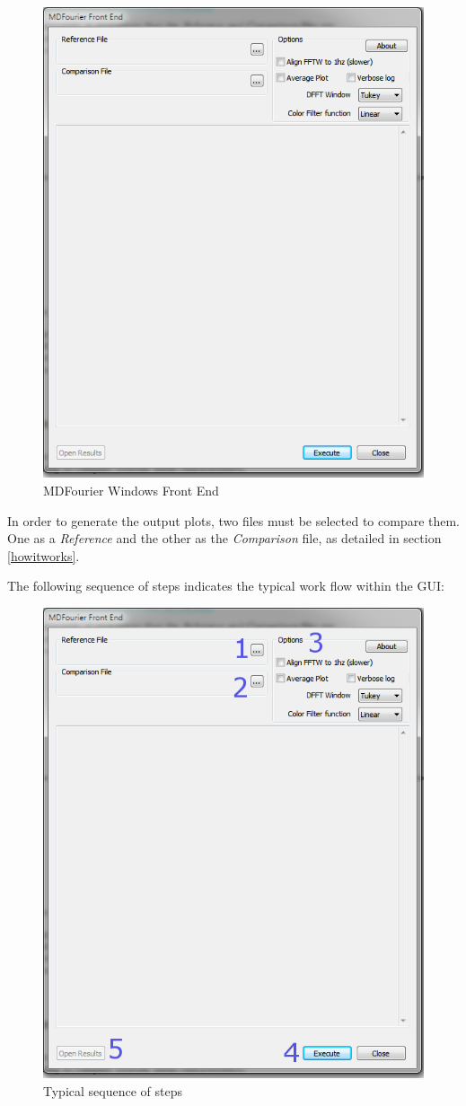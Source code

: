 \documentclass[10pt,a4paper]{report}
\begin{document}
\begin{figure}[H]
	\centering
	\includegraphics[width=0.6\linewidth]{plots/GUI1.png}
	\caption[Front End]{MDFourier Windows Front End}
	\label{fig:gui1}
\end{figure}

In order to generate the output plots, two files must be selected to compare them. One as a \textit{Reference} and the other as the \textit{Comparison} file, as detailed in section \ref{howitworks}.

The following sequence of steps indicates the typical work flow within the GUI:

\begin{figure}[H]
	\centering
	\includegraphics[width=0.6\linewidth]{plots/GUI2.png}
	\caption[Steps]{Typical sequence of steps}
	\label{fig:gui2}
\end{figure}
\end{document}
